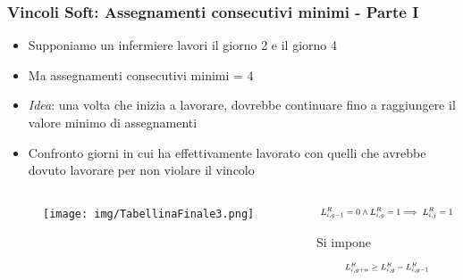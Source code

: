 \documentclass[xcolor={dvipsnames, table}]{beamer}
\newcommand\scalemath[2]{\scalebox{#1}{\mbox{\ensuremath{\displaystyle #2}}}}
\begin{document}
\begin{frame}
	\frametitle{Vincoli Soft: Assegnamenti consecutivi minimi - Parte I}
	\begin{itemize}
	\item Supponiamo un infermiere lavori il giorno 2 e il giorno 4
	\item Ma assegnamenti consecutivi minimi = 4
	\item \textit{Idea}: una volta che inizia a lavorare, dovrebbe continuare fino a raggiungere il valore minimo di assegnamenti
	\item Confronto giorni in cui ha effettivamente lavorato con quelli che avrebbe dovuto lavorare per non violare il vincolo
	\end{itemize}
	\begin{columns}
	\begin{column}{0.70\textwidth}
	\begin{figure}[h!]
	\begin{center}
  	\texttt{[image: img/TabellinaFinale3.png]}
	\end{center}
\end{figure}
	\end{column}
	\begin{column}{0.40\textwidth}
	\begin{equation*}
	\scalemath{0.7}{
	\begin{aligned}
	L_{i, g-1}^R = 0 &\wedge L_{i, g}^R = 1 \Longrightarrow\ L_{i, j}^R = 1 \\
	\end{aligned}
	}
	\end{equation*}
	\begin{block}{Si impone}
	\begin{equation*}
	\scalemath{0.7}{
	\begin{aligned}
	L_{i, g+n}^R &\geq L_{i, g}^R - L_{i, g-1}^R \\
	\end{aligned}
	}
	\end{equation*}
	\end{block}
	\end{column}
	\end{columns}
	
	
	
	
	

\end{frame}
\end{document}
